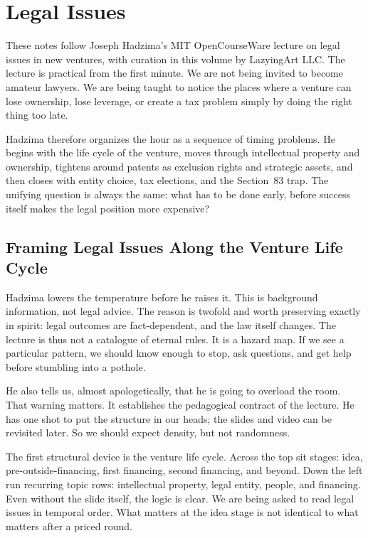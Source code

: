 \chapter{Legal Issues}

These notes follow Joseph Hadzima's MIT OpenCourseWare lecture on legal issues in new ventures, with curation in this volume by LazyingArt LLC. The lecture is practical from the first minute. We are not being invited to become amateur lawyers. We are being taught to notice the places where a venture can lose ownership, lose leverage, or create a tax problem simply by doing the right thing too late.

Hadzima therefore organizes the hour as a sequence of timing problems. He begins with the life cycle of the venture, moves through intellectual property and ownership, tightens around patents as exclusion rights and strategic assets, and then closes with entity choice, tax elections, and the Section~83 trap. The unifying question is always the same: what has to be done early, before success itself makes the legal position more expensive?

\section{Framing Legal Issues Along the Venture Life Cycle}

Hadzima lowers the temperature before he raises it. This is background information, not legal advice. The reason is twofold and worth preserving exactly in spirit: legal outcomes are fact-dependent, and the law itself changes. The lecture is thus not a catalogue of eternal rules. It is a hazard map. If we see a particular pattern, we should know enough to stop, ask questions, and get help before stumbling into a pothole.

He also tells us, almost apologetically, that he is going to overload the room. That warning matters. It establishes the pedagogical contract of the lecture. He has one shot to put the structure in our heads; the slides and video can be revisited later. So we should expect density, but not randomness.

The first structural device is the venture life cycle. Across the top sit stages: idea, pre-outside-financing, first financing, second financing, and beyond. Down the left run recurring topic rows: intellectual property, legal entity, people, and financing. Even without the slide itself, the logic is clear. We are being asked to read legal issues in temporal order. What matters at the idea stage is not identical to what matters after a priced round.

